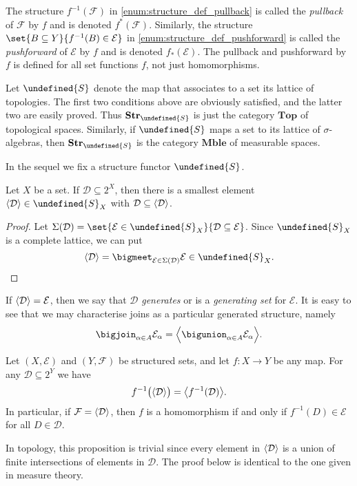 \documentclass[article, a4paper, 11pt, oneside]{memoir}
\let\mathfrak\undefined
\numberwithin{equation}{chapter}
\newcommand{\calE}{\mathcal{E}}
\newcommand{\calD}{\mathcal{D}}
\newcommand{\calF}{\mathcal{F}}
\newcommand{\strucS}{\mathfrak{S}}
\DeclarePairedDelimiter{\gen}{\langle}{\rangle} %
\newcommand{\powerset}[1]{2^{#1}}
\newcommand{\ncat}[1]{\mathbf{#1}} %
\newcommand{\catTop}{\ncat{Top}} %
\newcommand{\catMble}{\ncat{Mble}} %
\newcommand{\catStruc}[1]{\ncat{Str}_{#1}} %
\newcommand{\catStrucS}{\catStruc{\strucS}} %
\begin{document}
The structure $f^{-1}(\calF)$ in \cref{enum:structure_def_pullback} is called the \emph{pullback} of $\calF$ by $f$ and is denoted $f^*(\calF)$. Similarly, the structure $\set{B \subseteq Y}{f^{-1}(B) \in \calE}$ in \cref{enum:structure_def_pushforward} is called the \emph{pushforward} of $\calE$ by $f$ and is denoted $f_*(\calE)$. The pullback and pushforward by $f$ is defined for all set functions $f$, not just homomorphisms.

\begin{example}
    Let $\strucS$ denote the map that associates to a set its lattice of topologies. The first two conditions above are obviously satisfied, and the latter two are easily proved. Thus $\catStrucS$ is just the category $\catTop$ of topological spaces. Similarly, if $\strucS$ maps a set to its lattice of $\sigma$-algebras, then $\catStrucS$ is the category $\catMble$ of measurable spaces.
\end{example}

In the sequel we fix a structure functor $\strucS$.

\begin{lemma}
    Let $X$ be a set. If $\calD \subseteq \powerset{X}$, then there is a smallest element $\gen{\calD} \in \strucS_X$ with $\calD \subseteq \gen{\calD}$.
\end{lemma}

\begin{proof}
    Let $\Sigma(\calD) = \set{\calE \in \strucS_X}{\calD \subseteq \calE}$. Since $\strucS_X$ is a complete lattice, we can put
    \begin{equation*}
        \gen{\calD} = \bigmeet_{\calE \in \Sigma(\calD)} \calE \in \strucS_X.
    \end{equation*}
\end{proof}
%
If $\gen{\calD} = \calE$, then we say that $\calD$ \emph{generates} or is a \emph{generating set} for $\calE$. It is easy to see that we may characterise joins as a particular generated structure, namely
%
\begin{equation}
    \label{eq:join_as_generated_structure}
    \bigjoin_{\alpha \in A} \calE_\alpha
        = \gen[\Big]{ \bigunion_{\alpha \in A} \calE_\alpha }.
\end{equation}

\begin{proposition}
    \label{thm:preimage_and_generation_commute}
    Let $(X,\calE)$ and $(Y,\calF)$ be structured sets, and let $f \colon X \to Y$ be any map. For any $\calD \subseteq 2^Y$ we have
    \begin{equation*}
        f^{-1}\bigl( \gen{\calD} \bigr) = \gen[\big]{f^{-1}(\calD)}.
    \end{equation*}
    In particular, if $\calF = \gen{\calD}$, then $f$ is a homomorphism if and only if $f^{-1}(D) \in \calE$ for all $D \in \calD$.
\end{proposition}
%
In topology, this proposition is trivial since every element in $\gen{\calD}$ is a union of finite intersections of elements in $\calD$. The proof below is identical to the one given in measure theory.
\end{document}
